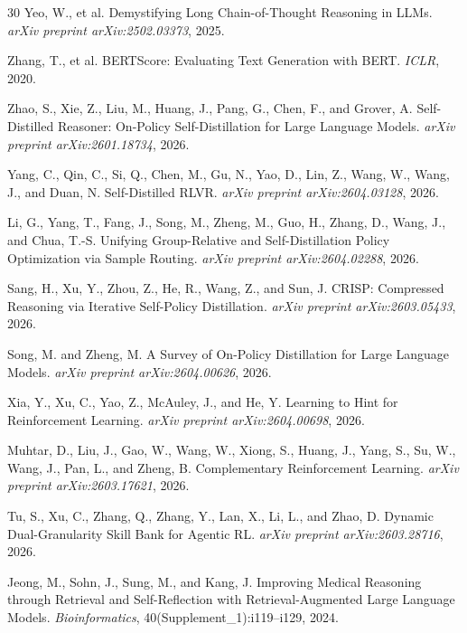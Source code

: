 \documentclass{article}
\begin{document}
\begin{thebibliography}{30}
Yeo, W., et al.
\newblock Demystifying Long Chain-of-Thought Reasoning in LLMs.
\newblock \emph{arXiv preprint arXiv:2502.03373}, 2025.

Zhang, T., et al.
\newblock BERTScore: Evaluating Text Generation with BERT.
\newblock \emph{ICLR}, 2020.

Zhao, S., Xie, Z., Liu, M., Huang, J., Pang, G., Chen, F., and Grover, A.
\newblock Self-Distilled Reasoner: On-Policy Self-Distillation for Large Language Models.
\newblock \emph{arXiv preprint arXiv:2601.18734}, 2026.

Yang, C., Qin, C., Si, Q., Chen, M., Gu, N., Yao, D., Lin, Z., Wang, W., Wang, J., and Duan, N.
\newblock Self-Distilled RLVR.
\newblock \emph{arXiv preprint arXiv:2604.03128}, 2026.

Li, G., Yang, T., Fang, J., Song, M., Zheng, M., Guo, H., Zhang, D., Wang, J., and Chua, T.-S.
\newblock Unifying Group-Relative and Self-Distillation Policy Optimization via Sample Routing.
\newblock \emph{arXiv preprint arXiv:2604.02288}, 2026.

Sang, H., Xu, Y., Zhou, Z., He, R., Wang, Z., and Sun, J.
\newblock CRISP: Compressed Reasoning via Iterative Self-Policy Distillation.
\newblock \emph{arXiv preprint arXiv:2603.05433}, 2026.

Song, M. and Zheng, M.
\newblock A Survey of On-Policy Distillation for Large Language Models.
\newblock \emph{arXiv preprint arXiv:2604.00626}, 2026.

Xia, Y., Xu, C., Yao, Z., McAuley, J., and He, Y.
\newblock Learning to Hint for Reinforcement Learning.
\newblock \emph{arXiv preprint arXiv:2604.00698}, 2026.

Muhtar, D., Liu, J., Gao, W., Wang, W., Xiong, S., Huang, J., Yang, S., Su, W., Wang, J., Pan, L., and Zheng, B.
\newblock Complementary Reinforcement Learning.
\newblock \emph{arXiv preprint arXiv:2603.17621}, 2026.

Tu, S., Xu, C., Zhang, Q., Zhang, Y., Lan, X., Li, L., and Zhao, D.
\newblock Dynamic Dual-Granularity Skill Bank for Agentic RL.
\newblock \emph{arXiv preprint arXiv:2603.28716}, 2026.

Jeong, M., Sohn, J., Sung, M., and Kang, J.
\newblock Improving Medical Reasoning through Retrieval and Self-Reflection with Retrieval-Augmented Large Language Models.
\newblock \emph{Bioinformatics}, 40(Supplement\_1):i119--i129, 2024.

\end{thebibliography}
\end{document}
